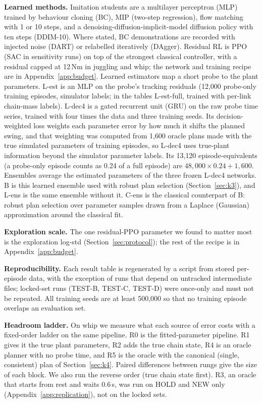 \textbf{Learned methods.} Imitation students are a multilayer perceptron (MLP) trained by behaviour cloning (BC), MIP (two-step regression), flow matching with 1 or 10 steps, and a denoising-diffusion-implicit-model diffusion policy with ten steps (DDIM-10). Where stated, BC demonstrations are recorded with injected noise (DART) or relabelled iteratively (DAgger). Residual RL is PPO (SAC in sensitivity runs) on top of the strongest classical controller, with a residual capped at 12\,Nm in juggling and whip; the network and training recipe are in Appendix~\ref{app:budget}. Learned estimators map a short probe to the plant parameters. L-est is an MLP on the probe's tracking residuals (12{,}000 probe-only training episodes, simulator labels; in the tables L-est-full, trained with per-link chain-mass labels). L-dec4 is a gated recurrent unit (GRU) on the raw probe time series, trained with four times the data and three training seeds. Its decision-weighted loss weights each parameter error by how much it shifts the planned swing, and that weighting was computed from 1{,}600 oracle plans made with the true simulated parameters of training episodes, so L-dec4 uses true-plant information beyond the simulator parameter labels. Its 13{,}120 episode-equivalents (a probe-only episode counts as 0.24 of a full episode) are $48{,}000\times0.24+1{,}600$. Ensembles average the estimated parameters of the three frozen L-dec4 networks. B is this learned ensemble used with robust plan selection (Section~\ref{sec:k3}), and L-ens is the same ensemble without it. C-ens is the classical counterpart of B: robust plan selection over parameter samples drawn from a Laplace (Gaussian) approximation around the classical fit.

\textbf{Exploration scale.} The one residual-PPO parameter we found to matter most is the exploration log-std (Section~\ref{sec:protocol}); the rest of the recipe is in Appendix~\ref{app:budget}.

\textbf{Reproducibility.} Each result table is regenerated by a script from stored per-episode data, with the exception of runs that depend on untracked intermediate files; locked-set runs (TEST-B, TEST-C, TEST-D) were once-only and must not be repeated. All training seeds are at least 500{,}000 so that no training episode overlaps an evaluation set.

\textbf{Headroom ladder.} On whip we measure what each source of error costs with a fixed-order ladder on the same pipeline. R0 is the fitted-parameter pipeline. R1 gives it the true plant parameters, R2 adds the true chain state, R4 is an oracle planner with no probe time, and R5 is the oracle with the canonical (single, consistent) plan of Section~\ref{sec:k4}. Paired differences between rungs give the size of each block. We also run the reverse order (true chain state first). R3, an oracle that starts from rest and waits 0.6\,s, was run on HOLD and NEW only (Appendix~\ref{app:replication}), not on the locked sets.

